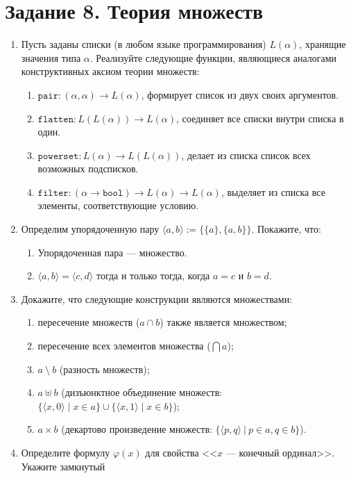\documentclass[10pt,a4paper,oneside]{article}
\begin{document}
\section*{Задание 8. Теория множеств}
\begin{enumerate}
\item Пусть заданы списки (в любом языке программирования) $L(\alpha)$, хранящие значения типа $\alpha$.
Реализуйте следующие функции, являющиеся аналогами конструктивных аксиом теории множеств:
\begin{enumerate}
\item $\texttt{pair}: (\alpha, \alpha) \rightarrow L(\alpha)$, формирует список из двух своих аргументов.
\item $\texttt{flatten}: L(L(\alpha)) \rightarrow L(\alpha)$, соединяет все списки внутри списка в один.
\item $\texttt{powerset}: L(\alpha) \rightarrow L(L(\alpha))$, делает из списка список всех возможных подсписков.
\item $\texttt{filter}: (\alpha \rightarrow \texttt{bool}) \rightarrow L(\alpha) \rightarrow L(\alpha)$,
выделяет из списка все элементы, соответствующие условию.
\end{enumerate}
\item Определим упорядоченную пару $\langle a,b\rangle := \{\{a\},\{a,b\}\}$. Покажите, что:
\begin{enumerate}
\item Упорядоченная пара --- множество.
\item $\langle a,b \rangle = \langle c,d\rangle$ тогда и только тогда, когда $a = c$ и $b = d$.
\end{enumerate}
\item Докажите, что следующие конструкции являются множествами: 
\begin{enumerate}\item пересечение множеств ($a \cap b$) также является множеством;
\item пересечение всех элементов множества ($\bigcap a$);
\item $a\ \setminus\ b$ (разность множеств);
\item $a \uplus b$ (дизъюнктное объединение множеств: $\{\langle x,0\rangle\mid x\in a\}\cup\{\langle x,1\rangle\mid x\in b\}$);
\item $a \times b$ (декартово произведение множеств: $\{\langle p,q\rangle\ |\ p\in a, q\in b\}$).
\end{enumerate}
\item Определите формулу $\varphi(x)$ для свойства <<$x$ --- конечный ординал>>. Укажите замкнутый

\end{enumerate}
\end{document}
